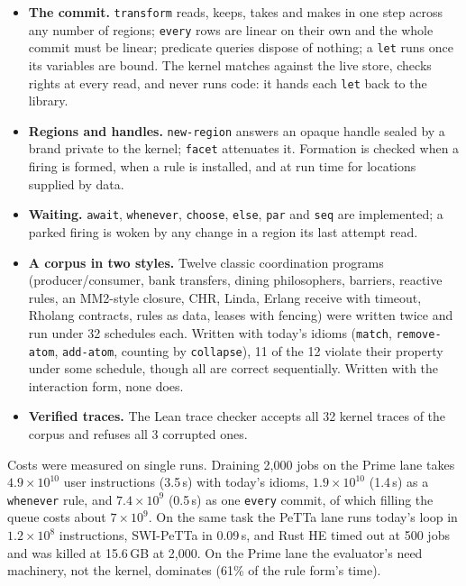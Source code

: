 \documentclass[11pt]{article}
\newcommand{\code}[1]{\texttt{#1}}
\newcommand{\PeTTa}{\textup{PeTTa}}
\newcommand{\HE}{\textup{HE}}
\begin{document}
\begin{itemize}
\item \textbf{The commit.} \code{transform} reads, keeps, takes and makes in
  one step across any number of regions; \code{every} rows are linear on their
  own and the whole commit must be linear; predicate queries dispose of nothing; a
  \code{let} runs once its variables are bound.  The kernel matches against the
  live store, checks rights at every read, and never runs code: it hands each
  \code{let} back to the library.
\item \textbf{Regions and handles.} \code{new-region} answers an opaque handle
  sealed by a brand private to the kernel; \code{facet} attenuates it.
  Formation is checked when a firing is formed, when a rule is installed, and
  at run time for locations supplied by data.
\item \textbf{Waiting.} \code{await}, \code{whenever}, \code{choose},
  \code{else}, \code{par} and \code{seq} are implemented; a parked firing is
  woken by any change in a region its last attempt read.
\item \textbf{A corpus in two styles.}  Twelve classic coordination programs
  (producer/consumer, bank transfers, dining philosophers, barriers, reactive
  rules, an MM2-style closure, CHR, Linda, Erlang receive with timeout, Rholang
  contracts, rules as data, leases with fencing) were written twice and run
  under 32 schedules each.  Written with today's idioms (\code{match},
  \code{remove-atom}, \code{add-atom}, counting by \code{collapse}), 11 of the
  12 violate their property under some schedule, though all are correct
  sequentially.  Written with the interaction form, none does.
\item \textbf{Verified traces.} The Lean trace checker accepts all 32 kernel
  traces of the corpus and refuses all 3 corrupted ones.
\end{itemize}

\noindent
Costs were measured on single runs.  Draining 2{,}000 jobs on the Prime lane
takes $4.9\times10^{10}$ user instructions (3.5\,s) with today's idioms,
$1.9\times10^{10}$ (1.4\,s) as a \code{whenever} rule, and $7.4\times10^{9}$
(0.5\,s) as one \code{every} commit, of which filling the queue costs about
$7\times10^{9}$.  On the same task the \PeTTa{} lane runs today's loop in
$1.2\times10^{8}$ instructions, SWI-\PeTTa{} in 0.09\,s, and Rust \HE{} timed
out at 500 jobs and was killed at 15.6\,GB at 2{,}000.  On the Prime lane the
evaluator's need machinery, not the kernel, dominates (61\% of the rule form's
time).
\end{document}
